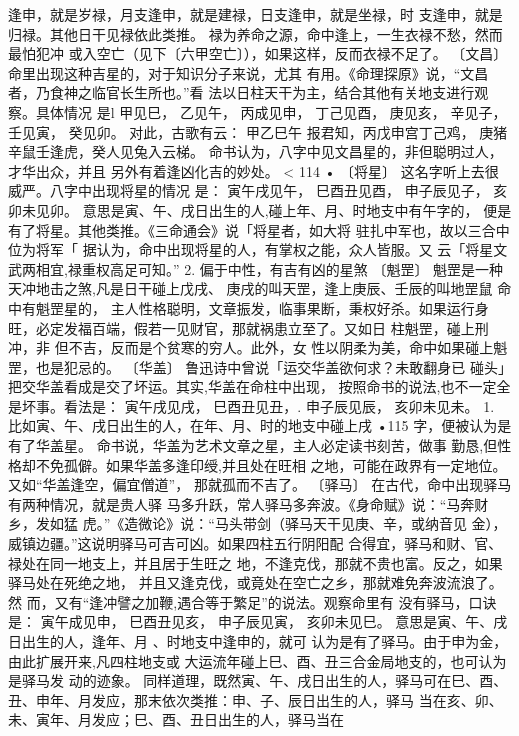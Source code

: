 逢申，就是岁禄，月支逢申，就是建禄，日支逢申，就是坐禄，时
支逢申，就是归禄。其他日干见禄依此类推。
禄为养命之源，命中逢上，一生衣禄不愁，然而最怕犯冲
或入空亡（见下〔六甲空亡〕），如果这样，反而衣禄不足了。
〔文昌〕 命里出现这种吉星的，对于知识分子来说，尤其
有用。《命理探原》说，“文昌者，乃食神之临官长生所也。”看
法以日柱天干为主，结合其他有关地支进行观察。具体情况
是l
甲见巳，
乙见午，
丙成见申，
丁己见酉，
庚见亥，
辛见子，
壬见寅，
癸见卯。
对此，古歌有云：
甲乙巳午 报君知，丙戊申宫丁己鸡，
庚猪辛鼠壬逢虎，癸人见兔入云梯。
命书认为，八字中见文昌星的，非但聪明过人，才华出众，并且
另外有着逢凶化吉的妙处。 <
114 •
〔将星〕 这名字听上去很威严。八字中出现将星的情况
是：
寅午戌见午，
巳酉丑见酉，
申子辰见子，
亥卯未见卯。
意思是寅、午、戌日出生的人,碰上年、月、时地支中有午字的，
便是有了将星。其他类推。《三命通会》说「将星者，如大将
驻扎中军也，故以三合中位为将军「
据认为，命中出现将星的人，有掌权之能，众人皆服。又
云「将星文武两相宜,禄重权高足可知。”
2. 偏于中性，有吉有凶的星煞
〔魁罡〕 魁罡是一种天冲地击之煞,凡是日干碰上戊戌、
庚戌的叫天罡，逢上庚辰、壬辰的叫地罡鼠 命中有魁罡星的，
主人性格聪明，文章振发，临事果断，秉权好杀。如果运行身
旺，必定发福百端，假若一见财官，那就祸患立至了。又如日
柱魁罡，碰上刑冲，非 但不吉，反而是个贫寒的穷人。此外，女
性以阴柔为美，命中如果碰上魁罡，也是犯忌的。
〔华盖〕 鲁迅诗中曾说「运交华盖欲何求？未敢翻身已
碰头」把交华盖看成是交了坏运。其实,华盖在命柱中出现，
按照命书的说法,也不一定全是坏事。看法是：
寅午戌见戌，
巳酉丑见丑，.
申子辰见辰，
亥卯未见未。 1.
比如寅、午、戌日出生的人，在年、月、时的地支中碰上戌
•115
字，便被认为是有了华盖星。
命书说，华盖为艺术文章之星，主人必定读书刻苦，做事
勤恳,但性格却不免孤僻。如果华盖多逢印绶,并且处在旺相
之地，可能在政界有一定地位。又如“华盖逢空，偏宜僧道”，
那就孤而不吉了。
〔驿马〕 在古代，命中出现驿马有两种情况，就是贵人驿
马多升跃，常人驿马多奔波。《身命赋》说：“马奔财乡，发如猛
虎。”《造微论》说：“马头带剑（驿马天干见庚、辛，或纳音见
金），威镇边疆。”这说明驿马可吉可凶。如果四柱五行阴阳配
合得宜，驿马和财、官、禄处在同一地支上，并且居于生旺之
地，不逢克伐，那就不贵也富。反之，如果驿马处在死绝之地，
并且又逢克伐，或竟处在空亡之乡，那就难免奔波流浪了。然
而，又有“逢冲譬之加鞭,遇合等于繁足”的说法。观察命里有
没有驿马，口诀是：
寅午成见申，
巳酉丑见亥，
申子辰见寅，
亥卯未见巳。
意思是寅、午、戌日出生的人，逢年、月 、时地支中逢申的，就可
认为是有了驿马。由于申为金，由此扩展开来,凡四柱地支或
大运流年碰上巳、酉、丑三合金局地支的，也可认为是驿马发
动的迹象。
同样道理，既然寅、午、戌日出生的人，驿马可在巳、酉、
丑、申年、月发应，那末依次类推：申、子、辰日出生的人，驿马
当在亥、卯、未、寅年、月发应；巳、酉、丑日出生的人，驿马当在
